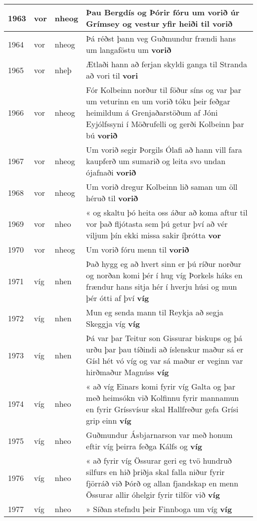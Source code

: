 \documentclass{article}
\begin{document}
\begin{longtable}{p{1cm}|p{1cm}|p{1cm}|p{13cm}}
\hline
1963&vor&nheog&Þau Bergdís og Þórir fóru um vorið úr Grímsey og vestur yfir heiði til \textbf{vorið} \\
\hline
1964&vor&nheog&Þá réðst þann veg Guðmundur frændi hans um langaföstu um \textbf{vorið} \\
\hline
1965&vor&nheþ&Ætlaði hann að ferjan skyldi ganga til Stranda að vori til \textbf{vori} \\
\hline
1966&vor&nheog&Fór Kolbeinn norður til föður síns og var þar um veturinn en um vorið tóku þeir feðgar heimildum á Grenjaðarstöðum af Jóni Eyjólfssyni í Möðrufelli og gerði Kolbeinn þar bú \textbf{vorið} \\
\hline
1967&vor&nheog&Um vorið segir Þorgils Ólafi að hann vill fara kaupferð um sumarið og leita svo undan ójafnaði \textbf{vorið} \\
\hline
1968&vor&nheog&Um vorið dregur Kolbeinn lið saman um öll héruð til \textbf{vorið} \\
\hline
1969&vor&nheo&« og skaltu þó heita oss áður að koma aftur til vor það fljótasta sem þú getur því að vér viljum þín ekki missa sakir íþrótta \textbf{vor} \\
\hline
1970&vor&nheog&Um vorið fóru menn til \textbf{vorið} \\
\hline
1971&víg&nhen&Það hygg eg að hvert sinn er þú ríður norður og norðan komi þér í hug víg Þorkels háks en frændur hans sitja hér í hverju húsi og mun þér ótti af því \textbf{víg} \\
\hline
1972&víg&nhen&Mun eg senda mann til Reykja að segja Skeggja víg \textbf{víg} \\
\hline
1973&víg&nhen&Þá var þar Teitur son Gissurar biskups og þá urðu þar þau tíðindi að íslenskur maður sá er Gísl hét vó víg og var sá maður er veginn var hirðmaður Magnúss \textbf{víg} \\
\hline
1974&víg&nheo&« að víg Einars komi fyrir víg Galta og þar með heimsókn við Kolfinnu fyrir mannamun en fyrir Gríssvísur skal Hallfreður gefa Grísi grip einn \textbf{víg} \\
\hline
1975&víg&nheo&Guðmundur Ásbjarnarson var með honum eftir víg þeirra feðga Kálfs og \textbf{víg} \\
\hline
1976&víg&nheo&« að fyrir víg Össurar geri eg tvö hundruð silfurs en hið þriðja skal falla niður fyrir fjörráð við Þórð og allan fjandskap en menn Össurar allir óhelgir fyrir tilför við \textbf{víg} \\
\hline
1977&víg&nheo&» Síðan stefndu þeir Finnboga um víg \textbf{víg} \\

\end{longtable}
\end{document}
